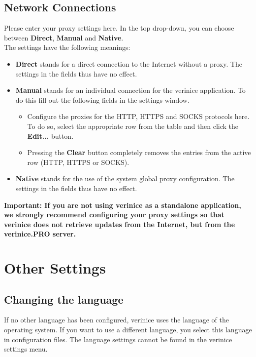 \documentclass[a4paper,10pt]{book}
\begin{document}
\section{Network Connections}
Please enter your proxy settings here. In the top drop-down, you can choose between \textbf{Direct}, \textbf{Manual} and \textbf{Native}.
\newline\\
The settings have the following meanings:
\begin{itemize}
 \item \textbf{Direct} stands for a direct connection to the Internet without a proxy. The settings in the fields thus have no effect.
 \item \textbf{Manual} stands for an individual connection for the verinice application. To do this fill out the following fields in the settings window.
  \begin{itemize}
   \item Configure the proxies for the HTTP, HTTPS and SOCKS protocols here. To do so, select the appropriate row from the table and then click the \textbf{Edit...} button.
   \item Pressing the \textbf{Clear} button completely removes the entries from the active row (HTTP, HTTPS or SOCKS).
  \end{itemize}
 \item \textbf{Native} stands for the use of the system global proxy configuration. The settings in the fields thus have no effect.
\end{itemize}
\textbf{Important: If you are not using verinice as a standalone application, we strongly recommend configuring
your proxy settings so that verinice does not retrieve updates from the Internet, but from the
verinice.\textsc{PRO} server.}

\chapter{Other Settings}\label{chap:other-settings}
\section{Changing the language}
\label{sec:changing-language}

If no other language has been configured, verinice uses the language of the operating system. If you want to use a different language, you select this language in configuration files. The language settings cannot be found in the verinice settings menu.
\end{document}
